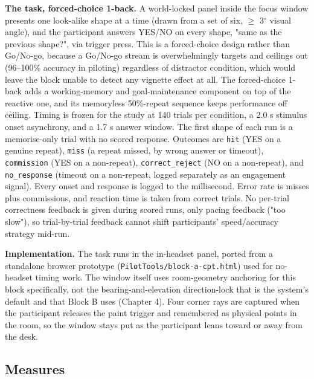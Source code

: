 \textbf{The task, forced-choice 1-back.} A world-locked panel inside the focus window presents one
look-alike shape at a time (drawn from a set of six, $\geq$ 3$^{\circ}$ visual angle), and the participant
answers YES/NO on every shape, "same as the previous shape?", via trigger press. This is a
forced-choice design rather than Go/No-go, because a Go/No-go stream is overwhelmingly targets and
ceilings out (96–100\% accuracy in piloting) regardless of distractor condition, which would leave
the block unable to detect any vignette effect at all. The forced-choice 1-back adds a
working-memory and goal-maintenance component on top of the reactive one, and its memoryless
50\%-repeat sequence keeps performance off ceiling. Timing is frozen for the study at 140 trials per
condition, a 2.0 s stimulus onset asynchrony, and a 1.7 s answer window. The first
shape of each run is a memorise-only trial with no scored response. Outcomes are \verb|hit| (YES on a
genuine repeat), \verb|miss| (a repeat missed, by wrong answer or timeout), \verb|commission| (YES on a
non-repeat), \verb|correct_reject| (NO on a non-repeat), and \verb|no_response| (timeout on a non-repeat,
logged separately as an engagement signal). Every onset and response is logged to the millisecond.
Error rate is misses plus commissions, and reaction time is taken from correct trials. No per-trial
correctness feedback is given during scored runs, only pacing feedback ("too slow"), so
trial-by-trial feedback cannot shift participants' speed/accuracy strategy mid-run.

\textbf{Implementation.} The task runs in the in-headset panel, ported from a standalone browser
prototype (\verb|PilotTools/block-a-cpt.html|) used for no-headset timing work. The window itself
uses room-geometry anchoring for this block specifically, not the
bearing-and-elevation direction-lock that is the system's default and that Block B uses (Chapter 4).
Four corner rays are captured when the participant releases the paint trigger and remembered as
physical points in the room, so the window stays put as the participant leans toward or away from the
desk.

\subsection{Measures}

